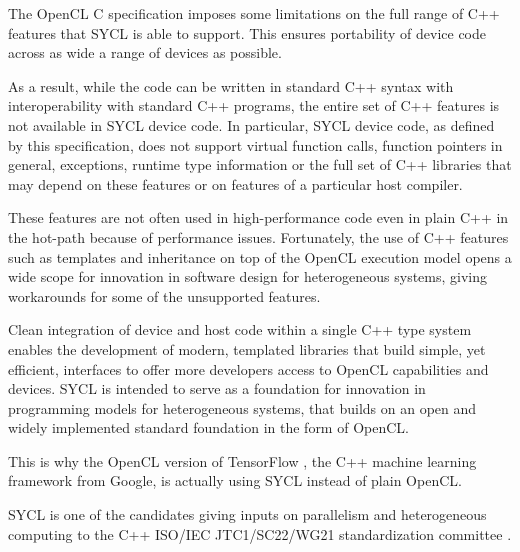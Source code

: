 \documentclass[sigplan]{acmart}
\begin{document}
The OpenCL C specification imposes some limitations on the full range
of C++ features that SYCL is able to support. This ensures portability
of device code across as wide a range of devices as possible.

As a result, while the code can be written in standard C++ syntax with
interoperability with standard C++ programs, the entire set of C++
features is not available in SYCL device code. In particular, SYCL
device code, as defined by this specification, does not support
virtual function calls, function pointers in general, exceptions,
runtime type information or the full set of C++ libraries that may
depend on these features or on features of a particular host compiler.

These features are not often used in high-performance code even
in plain C++ in the hot-path because of performance issues.
Fortunately, the use of C++ features such as templates and inheritance
on top of the OpenCL execution model opens a wide scope for innovation
in software design for heterogeneous systems, giving workarounds for
some of the unsupported features.

Clean integration of device and host code within a single C++ type
system enables the development of modern, templated libraries that
build simple, yet efficient, interfaces to offer more developers
access to OpenCL capabilities and devices. SYCL is intended to serve
as a foundation for innovation in programming models for heterogeneous
systems, that builds on an open and widely implemented standard
foundation in the form of OpenCL.

This is why the OpenCL version of TensorFlow \cite{TensorFlow-1.0},
the C++ machine learning framework from Google, is actually using SYCL
instead of plain OpenCL.

SYCL is one of the candidates giving inputs on parallelism and
heterogeneous computing to the C++ ISO/IEC JTC1/SC22/WG21
standardization committee
\cite{C++:P00236R0:SYCL,C++:P0362R0,C++:P0363R0,C++:P0367R0}.

\end{document}
